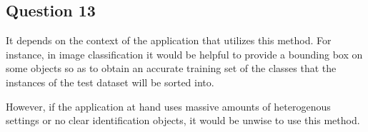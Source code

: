 \noindent{}


\subsection{Question 13}

It depends on the context of the application that utilizes this method.
For instance, in image classification it would be helpful to provide a bounding
box on some objects so as to obtain an accurate training set of the classes that
the instances of the test dataset will be sorted into.

However, if the application at hand uses massive amounts of heterogenous settings
or no clear identification objects, it would be unwise to use this method.

